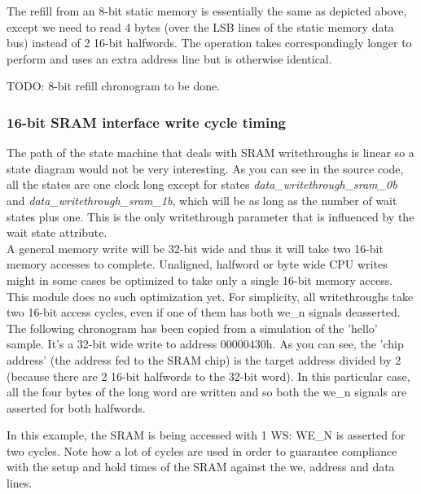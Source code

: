 The refill from an 8-bit static memory is essentially the same as depicted 
above, except we need to read 4 bytes (over the LSB lines of the static memory 
data bus) instead of 2 16-bit halfwords. The operation takes correspondingly
longer to perform and uses an extra address line but is otherwise identical.

TODO: 8-bit refill chronogram to be done.


\subsubsection{16-bit SRAM interface write cycle timing}
\label{sram_write_cycle}

The path of the state machine that deals with SRAM writethroughs is linear so 
a state diagram would not be very interesting. As you can see in the source 
code, all the states are one clock long except for states 
\emph{data\_writethrough\_sram\_0b} and \emph{data\_writethrough\_sram\_1b}, 
which will be as long as the number of wait states plus one.
This is the only writethrough parameter that is influenced by the wait state 
attribute.\\

A general memory write will be 32-bit wide and thus it will take two 16-bit 
memory accesses to complete. Unaligned, halfword or byte wide CPU writes might 
in some cases be optimized to take only a single 16-bit memory access. This 
module does no such optimization yet.
For simplicity, all writethroughs take two 16-bit access cycles, even if one
of them has both we\_n signals deasserted.\\

The following chronogram has been copied from a simulation of the 'hello' 
sample. It's a 32-bit wide write to address 00000430h.
As you can see, the 'chip address' (the address fed to the SRAM chip) is the 
target address divided by 2 (because there are 2 16-bit halfwords to the 32-bit 
word). In this particular case, all the four bytes of the long word are written 
and so both the we\_n signals are asserted for both halfwords.

In this example, the SRAM is being accessed with 1 WS: WE\_N is asserted for
two cycles. 
Note how a lot of cycles are used in order to guarantee compliance with the
setup and hold times of the SRAM against the we, address and data lines.

